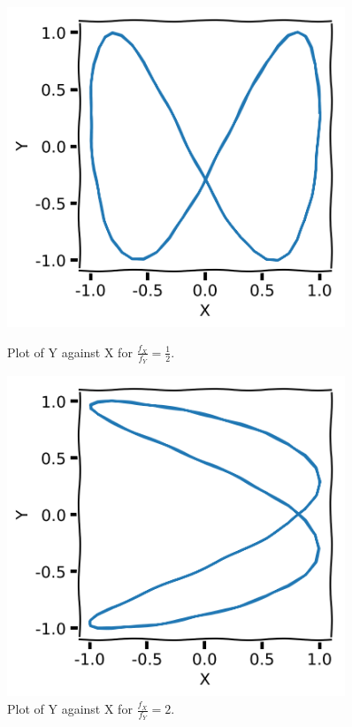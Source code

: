 \documentclass[11pt]{article}
\begin{document}
\begin{figure}[htp]
\centering
	\begin{minipage}{0.45\textwidth}
	\centering
	\includegraphics[width=0.9\textwidth]{lissajous_2_4_1_1_0.3_0.01_100.png}
	\caption{Plot of Y against X for $\frac{f_X}{f_Y}=\frac{1}{2}$.}
	\label{ratio0.5}
	\end{minipage}\hfill	
	\begin{minipage}{0.45\textwidth}
	\centering
	\includegraphics[width=0.9\textwidth]{lissajous_4_2_1_1_0.3_0.01_100.png}
	\caption{Plot of Y against X for $\frac{f_X}{f_Y}=2$.}
	\label{ratio5}
	\end{minipage}
\end{figure}
\end{document}
